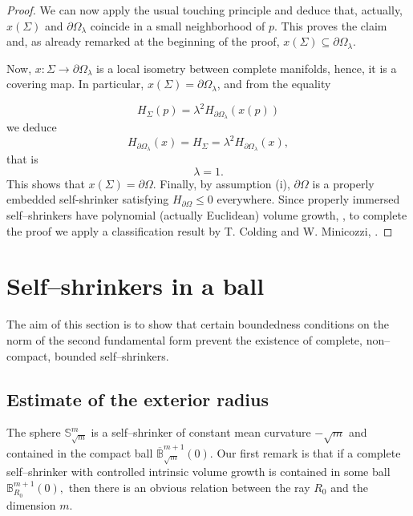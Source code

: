 \documentclass[11pt,leqno]{amsart}\usepackage{amsmath}
\numberwithin{equation}{section}
\begin{document}
\begin{proof}
We can now apply the usual touching principle and deduce that, actually,
$x(\Sigma)$ and $\partial\Omega_{\lambda}$ coincide in a small neighborhood of $p$. This
proves the claim and, as already remarked at the beginning of the proof,
$x\left(  \Sigma\right)  \subseteq\partial\Omega_{\lambda}$.

Now,
$x:\Sigma\rightarrow\partial\Omega_{\lambda}$ is a local isometry between
complete manifolds, hence, it is a covering map. In particular, $x\left(  \Sigma\right) =\partial\Omega_{\lambda}$, and from the equality

\[
H_{\Sigma}\left(  p\right)  =\lambda^{2}H_{\partial\Omega_{\lambda}}\left(
x\left(  p\right)  \right)
\]
we deduce\[
H_{\partial\Omega_{\lambda}}\left(  x\right)  =H_{\Sigma
} =\lambda^{2}H_{\partial\Omega_{\lambda}}\left(  x\right)  ,
\]
that is
\[
\lambda=1.
\]
This shows that $x(\Sigma)=\partial\Omega$. Finally, by assumption (i),
$\partial\Omega$ is a properly embedded self-shrinker satisfying
$H_{\partial\Omega}\leq0$ everywhere. Since properly immersed self--shrinkers
have polynomial (actually Euclidean) volume growth, \cite{DiXi-proper,
ChZh-volume}, to complete the proof we apply a classification result by T.
Colding and W. Minicozzi, \cite[Theorem 0.17]{CoMi-Annals2012}.
\end{proof}



\section{Self--shrinkers in a ball}\label{section ball}

The aim of this section is to show that certain  boundedness conditions on the norm of the second fundamental form prevent the existence of complete, non--compact, bounded self--shrinkers.

\subsection{Estimate of the exterior radius}

The sphere $\mathbb{S}_{\sqrt{m}}^{m}$ is a self--shrinker of  constant mean curvature $-\sqrt{m}$ and contained
in the compact ball $\overline{\mathbb{B}}_{\sqrt{m}}^{m+1}\left(  0\right)
$. Our first remark is that if a complete self--shrinker with controlled intrinsic volume growth is contained in some
ball $\mathbb{B}_{R_{0}}^{m+1}\left(  0\right)  ,$ then there is an obvious
relation between the ray $R_{0}$ and the dimension $m$.
\end{document}
